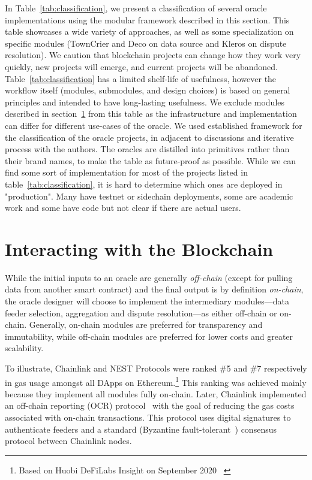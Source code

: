 In Table~\ref{tab:classification}, we present a classification of several oracle implementations using the modular framework described in this section. This table showcases a wide variety of approaches, as well as some specialization on specific modules (\eg TownCrier and Deco on data source and Kleros on dispute resolution). We caution that blockchain projects can change how they work very quickly, new projects will emerge, and current projects will be abandoned. Table~\ref{tab:classification} has a limited shelf-life of usefulness, however the workflow itself (modules, submodules, and design choices) is based on general principles and intended to have long-lasting usefulness. We exclude modules described in section~\ref{Interoperability} from this table as the infrastructure and implementation can differ for different use-cases of the oracle. We used established framework for the classification of the oracle projects, in adjacent to discussions and iterative process with the authors. The oracles are distilled into primitives rather than their brand names, to make the table as future-proof as possible. 
While we can find some sort of implementation for most of the projects listed in table~\ref{tab:classification}, it is hard to determine which ones are deployed in "production". Many have testnet or sidechain deployments, some are academic work and some have code but not clear if there are actual users. 



\section{Interacting with the Blockchain}\label{Interoperability}

While the initial inputs to an oracle are generally \textit{off-chain} (except for pulling data from another smart contract) and the final output is by definition \textit{on-chain}, the oracle designer will choose to implement the intermediary modules---data feeder selection, aggregation and dispute resolution---as either off-chain or on-chain. Generally, on-chain modules are preferred for transparency and immutability, while off-chain modules are preferred for lower costs and greater scalability. 

To illustrate, Chainlink and NEST Protocols were ranked \#5 and \#7 respectively in gas usage amongst all DApps on Ethereum.\footnote{Based on Huobi DeFiLabs Insight on September 2020 ~\cite{huobiDeFiLabs}} This ranking was achieved mainly because they implement all modules fully on-chain. Later, Chainlink implemented an off-chain reporting (OCR) protocol~\cite{chainlinkocr} with the goal of reducing the gas costs associated with on-chain transactions. This protocol uses digital signatures to authenticate feeders and a standard (\eg Byzantine fault-tolerant~\cite{castro2002practical}) consensus protocol between Chainlink nodes.

